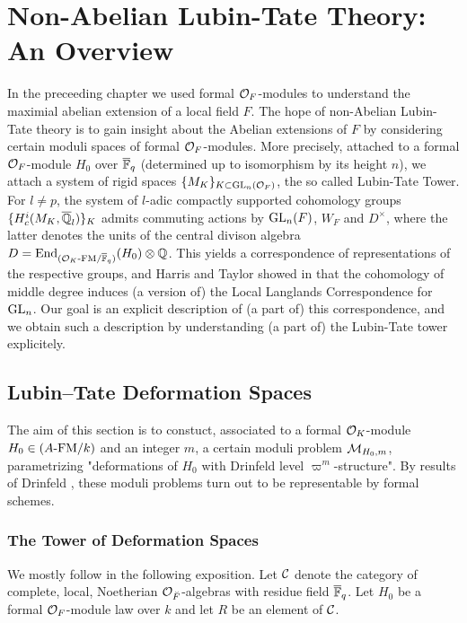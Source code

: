 \documentclass[../main.tex]{subfiles}
\begin{document}
\section{Non-Abelian Lubin-Tate Theory: An Overview} %
\label{sec:Non-Abelian Lubin-Tate Theory: An Overview}
In the preceeding chapter we used formal $\mathcal{O}_F$-modules to understand the 
maximial abelian extension of a local field $F$. The hope of non-Abelian Lubin-Tate
theory is to gain insight about the Abelian extensions of $F$ by considering
certain moduli spaces of formal $\mathcal{O}_F$-modules.
More precisely, attached to a formal $\mathcal{O}_F$-module $H_0$ over ${\overline {\mathbb{F}}_q}$ (determined
up to isomorphism by its height $n$), we attach a system of rigid spaces 
$\{M_K\}_{K \subset \operatorname{GL}_n(\mathcal{O}_F)}$, the so called Lubin-Tate Tower. For $l \neq p$, 
the system of $l$-adic compactly supported cohomology groups $\{H_c^{i}(M_K,
\overline {\mathbb{Q}}_l)\}_K$ admits commuting actions by $\operatorname{GL}_n(F)$, $W_F$ and $D^\times$,
where the latter denotes the units of the central divison algebra $D =
\operatorname{End}_{{({\mathcal{O}_K}\text-\allowbreak\mathrm{FM}/{{\overline {\mathbb{F}}_q}})}}(H_0) \otimes \mathbb{Q}$. This yields a correspondence of 
representations of the respective groups, and Harris and Taylor showed in
\cite{HTShimura} that the cohomology of middle degree induces (a version of)
the Local Langlands Correspondence for $\operatorname{GL}_n$. Our goal is an explicit
description of (a part of) this correspondence, and we obtain such a
description by understanding (a part of) the Lubin-Tate tower explicitely.

\subsection{Lubin--Tate Deformation Spaces} %
\label{sub:Lubin-Tate Deformation Spaces}
The aim of this section is to constuct, associated to a formal $\mathcal{O}_K$-module
$H_0 \in {({A}\text-\allowbreak\mathrm{FM}/{k})}$ and an integer $m$, a certain moduli problem $\mathcal{M}_{H_0, m}$,
parametrizing "deformations of $H_0$ with Drinfeld level $\varpi^m$-structure".
By results of Drinfeld \cite{drinfel1974elliptic}, these moduli problems turn
out to be representable by formal schemes. 

\subsubsection{The Tower of Deformation Spaces} %
\label{ssub:The Tower of Deformation Spaces}
We mostly follow \cite[Chapter 2]{Strauch2008DefSp} in the following
exposition. Let $\mathcal{C}$ denote the category of complete, local, Noetherian $\mathcal{O}_{\breve {F}}$-algebras with residue field $\overline {\mathbb{F}}_q$.
Let $H_0$ be a formal $\mathcal{O}_F$-module law over $k$ and let $R$ be an element of 
$\mathcal{C}$.
\end{document}
